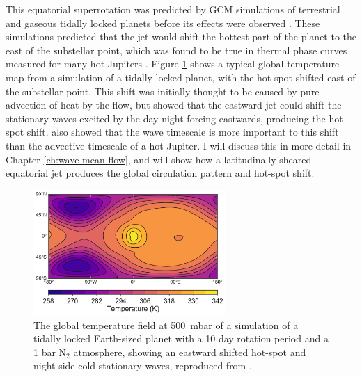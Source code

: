 This equatorial superrotation was predicted by GCM simulations of terrestrial and gaseous tidally locked planets before its effects were observed \citep{joshi1997tidally, showman2002atmospheric}. These simulations predicted that the jet would shift the hottest part of the planet to the east of the substellar point, which was found to be true in thermal phase curves measured for many hot Jupiters \citep{parmentier2017handbook}. Figure \ref{fig:review-ar_mediumT_10day} shows a typical global temperature map from a simulation of a tidally locked planet, with the hot-spot shifted east of the substellar point. This shift was initially thought to be caused by pure advection of heat by the flow, but \citet{tsai2014three} showed that the eastward jet could shift the stationary waves excited by the day-night forcing eastwards, producing the hot-spot shift. \citet{perez2013atmospheric} also showed that the wave timescale is more important to this shift than the advective timescale of a hot Jupiter. I will discuss this in more detail in Chapter \ref{ch:wave-mean-flow}, and will show how a latitudinally sheared equatorial jet produces the global circulation pattern and hot-spot shift.

\begin{figure}
  \centering
  \includegraphics[width=0.65\textwidth]{figures/lit-review/ar_mediumT_10day.pdf}
\caption{The global temperature field at \SI{500}{\milli\bar} of a simulation of a tidally locked Earth-sized planet with a 10 day rotation period and a 1 bar N$_{2}$ atmosphere, showing an eastward shifted hot-spot and night-side cold stationary waves, reproduced from \citet{pierrehumbert2018review}.}\label{fig:review-ar_mediumT_10day}
\end{figure}



